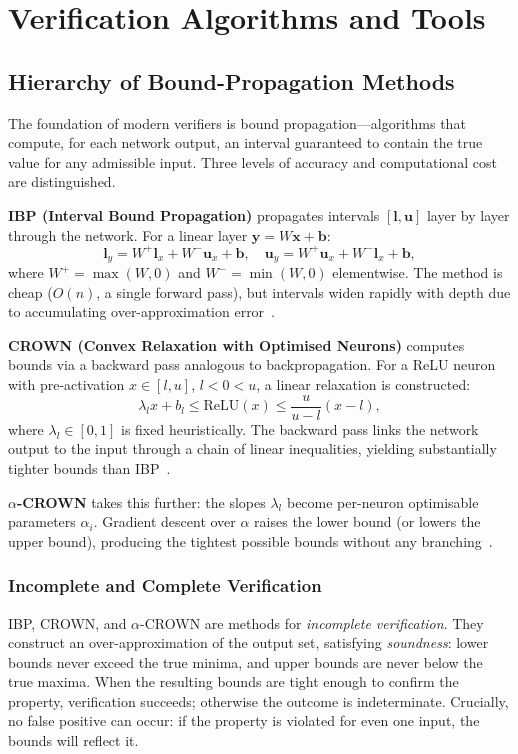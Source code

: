 \section{Verification Algorithms and Tools}

\subsection{Hierarchy of Bound-Propagation Methods}

The foundation of modern verifiers is bound propagation---algorithms that compute,
for each network output, an interval guaranteed to contain the true value for any
admissible input. Three levels of accuracy and computational cost are distinguished.

\textbf{IBP (Interval Bound Propagation)} propagates intervals $[\mathbf{l}, \mathbf{u}]$
layer by layer through the network.
For a linear layer $\mathbf{y} = W\mathbf{x} + \mathbf{b}$:
$$\mathbf{l}_y = W^+\mathbf{l}_x + W^-\mathbf{u}_x + \mathbf{b}, \quad
  \mathbf{u}_y = W^+\mathbf{u}_x + W^-\mathbf{l}_x + \mathbf{b},$$
where $W^+ = \max(W, 0)$ and $W^- = \min(W, 0)$ elementwise.
The method is cheap ($O(n)$, a single forward pass), but intervals widen
rapidly with depth due to accumulating over-approximation
error~\cite{CROWNPaper}.

\textbf{CROWN (Convex Relaxation with Optimised Neurons)} computes bounds via
a backward pass analogous to backpropagation.
For a ReLU neuron with pre-activation $x \in [l, u]$, $l < 0 < u$, a linear
relaxation is constructed:
$$\lambda_l x + b_l \leq \mathrm{ReLU}(x) \leq \frac{u}{u - l}(x - l),$$
where $\lambda_l \in [0, 1]$ is fixed heuristically.
The backward pass links the network output to the input through a chain of
linear inequalities, yielding substantially tighter bounds than
IBP~\cite{CROWNPaper}.

\textbf{$\alpha$-CROWN} takes this further: the slopes $\lambda_l$ become
per-neuron optimisable parameters $\alpha_i$. Gradient descent over $\alpha$
raises the lower bound (or lowers the upper bound), producing the tightest
possible bounds without any branching~\cite{AlphaBetaCrownVNNCOMP23}.

\subsubsection{Incomplete and Complete Verification}

IBP, CROWN, and $\alpha$-CROWN are methods for \textit{incomplete verification}.
They construct an over-approximation of the output set, satisfying
\textit{soundness}: lower bounds never exceed the true minima, and upper bounds
are never below the true maxima. When the resulting bounds are tight enough to
confirm the property, verification succeeds; otherwise the outcome is
indeterminate. Crucially, no false positive can occur: if the property is
violated for even one input, the bounds will reflect it.

